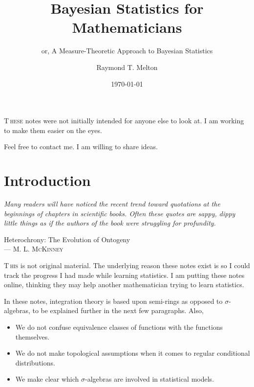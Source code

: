 \documentclass[
twoside=true,
paper=letter,
fontsize=9pt,
pagesize=auto,
leqno,
openany,
headsepline,
overfullrule,
]{scrbook}
\title{Bayesian Statistics for Mathematicians}
\subtitle{or, A Measure-Theoretic Approach to Bayesian Statistics}
\author{\textsf{Raymond T. Melton}}
\date{\textsf{\today}}
\theoremstyle{plain}
\theoremstyle{plain}
\theoremstyle{definition}
\theoremstyle{bfnoteitalic}
\theoremstyle{bfnoteroman}
\newcommand{\textsigma}{\hbox{\large{$\sigma$}}\kern-1pt}
\begin{document}
\frontmatter



\maketitle
{\renewcommand*\normalfont{}%
\normalfont%
\tableofcontents
}


\lettrine{T}{\,hese} notes were not initially intended for anyone else to look at.
I am working to make them easier on the eyes.

Feel free to contact me. I am willing to share ideas.



\mainmatter
\chapter{Introduction}
\epigraph{\textit{Many readers will have noticed the recent trend toward quotations at the beginnings of chapters in scientific books.  Often these quotes are sappy, dippy little things as if the authors of the book were struggling for profundity.}}
{{Heterochrony: The Evolution of Ontogeny}\\ \textsc{--- M. L. McKinney}}

\lettrine{T}{\,his}
is not original material.
The underlying reason these notes exist is so I could track the progress I had made while learning statistics.
I am putting these notes online, thinking  they may help another mathematician trying to learn statistics.


In these notes,
integration theory is based upon semi-rings as opposed to \textsigma\hyp{}algebras, to be explained further in the next few paragraphs.
Also,
\begin{itemize}
\item
We do not confuse equivalence classes of functions with the functions themselves.
\item
We do not make topological assumptions when it comes to regular conditional distributions.
\item
We make clear which \textsigma\hyp{}algebras are involved in statistical models.
\end{itemize}
\end{document}
